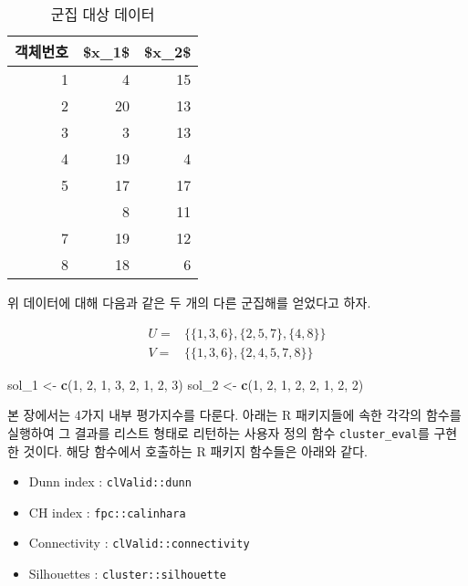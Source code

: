 \documentclass[]{book}
\newenvironment{Shaded}{\begin{snugshade}}{\end{snugshade}}
\newcommand{\DecValTok}[1]{\textcolor[rgb]{0.00,0.00,0.81}{#1}}
\newcommand{\KeywordTok}[1]{\textcolor[rgb]{0.13,0.29,0.53}{\textbf{#1}}}
\newcommand{\NormalTok}[1]{#1}
\newcommand{\StringTok}[1]{\textcolor[rgb]{0.31,0.60,0.02}{#1}}
\providecommand{\tightlist}{%
  \setlength{\itemsep}{0pt}\setlength{\parskip}{0pt}}
\begin{document}
\begin{table}[t]

\caption{\label{tab:cluster-eval-data}군집 대상 데이터}
\centering
\begin{tabular}{rrr}
\toprule
객체번호 & \$x\_1\$ & \$x\_2\$\\
\midrule
1 & 4 & 15\\
2 & 20 & 13\\
3 & 3 & 13\\
4 & 19 & 4\\
5 & 17 & 17\\
\addlinespace
6 & 8 & 11\\
7 & 19 & 12\\
8 & 18 & 6\\
\bottomrule
\end{tabular}
\end{table}

위 데이터에 대해 다음과 같은 두 개의 다른 군집해를 얻었다고 하자.

\begin{equation}
\begin{split}
U =& \{ \{1, 3, 6\}, \{2, 5, 7\}, \{4, 8\} \}\\
V =& \{ \{1, 3, 6\}, \{2, 4, 5, 7, 8\} \}
\end{split}
\label{eq:cluster-eval-two-solutions}
\end{equation}

\begin{Shaded}
\begin{Highlighting}[]
\NormalTok{sol_}\DecValTok{1}\NormalTok{ <-}\StringTok{ }\KeywordTok{c}\NormalTok{(}\DecValTok{1}\NormalTok{, }\DecValTok{2}\NormalTok{, }\DecValTok{1}\NormalTok{, }\DecValTok{3}\NormalTok{, }\DecValTok{2}\NormalTok{, }\DecValTok{1}\NormalTok{, }\DecValTok{2}\NormalTok{, }\DecValTok{3}\NormalTok{)}
\NormalTok{sol_}\DecValTok{2}\NormalTok{ <-}\StringTok{ }\KeywordTok{c}\NormalTok{(}\DecValTok{1}\NormalTok{, }\DecValTok{2}\NormalTok{, }\DecValTok{1}\NormalTok{, }\DecValTok{2}\NormalTok{, }\DecValTok{2}\NormalTok{, }\DecValTok{1}\NormalTok{, }\DecValTok{2}\NormalTok{, }\DecValTok{2}\NormalTok{)}
\end{Highlighting}
\end{Shaded}

본 장에서는 4가지 내부 평가지수를 다룬다. 아래는 R 패키지들에 속한 각각의 함수를 실행하여 그 결과를 리스트 형태로 리턴하는 사용자 정의 함수 \texttt{cluster\_eval}를 구현한 것이다. 해당 함수에서 호출하는 R 패키지 함수들은 아래와 같다.

\begin{itemize}
\tightlist
\item
  Dunn index \citep{dunn1973fuzzy}: \texttt{clValid::dunn}
\item
  CH index \citep{calinski1974dendrite}: \texttt{fpc::calinhara}
\item
  Connectivity \citep{handl2005exploiting}: \texttt{clValid::connectivity}
\item
  Silhouettes \citep{rousseeuw1987silhouettes}: \texttt{cluster::silhouette}
\end{itemize}
\end{document}
